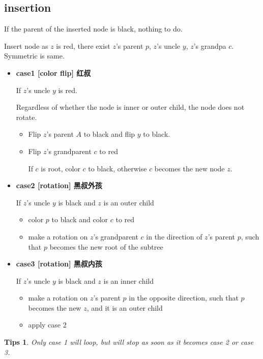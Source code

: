 \documentclass{article}
\newtheorem*{Tips}{Tips}
\begin{document}
\subsection{insertion}
If the parent of the inserted node is black, nothing to do. \par
Insert node as $z$ is red, there exist $z$'s parent $p$, $z$'s uncle $y$, $z$'s grandpa $c$. Symmetric is same. 
\begin{itemize}
    \item \textbf{case1 [color flip] 红叔} \par
          If $z$'s uncle $y$ is red. \par
          Regardless of whether the node is inner or outer child, the node does not rotate.
          \begin{itemize}
            \item Flip $z$'s parent $A$ to black and flip $y$ to black. \par
            \item Flip $z$'s grandparent $c$ to red \par
            If $c$ is root, color $c$ to black, otherwise $c$ becomes the new node $z$.
          \end{itemize}
    \item \textbf{case2 [rotation] 黑叔外孩} \par
          If $z$'s uncle $y$ is black and $z$ is an outer child
          \begin{itemize}
            \item color $p$ to black and color $c$ to red
            \item make a rotation on $z$'s grandparent $c$ in the direction of $z$'s parent $p$, such that $p$ becomes the new root of the subtree
          \end{itemize}
    \item \textbf{case3 [rotation] 黑叔内孩} \par
          If $z$'s uncle $y$ is black and $z$ is an inner child
          \begin{itemize}
            \item make a rotation on $z$'s parent $p$ in the opposite direction, such that $p$ becomes the new $z$, and it is an outer child
            \item apply case 2
          \end{itemize}
\end{itemize}

\begin{Tips}
    Only case 1 will loop, but will stop as soon as it becomes case 2 or case 3.
\end{Tips}
\end{document}
